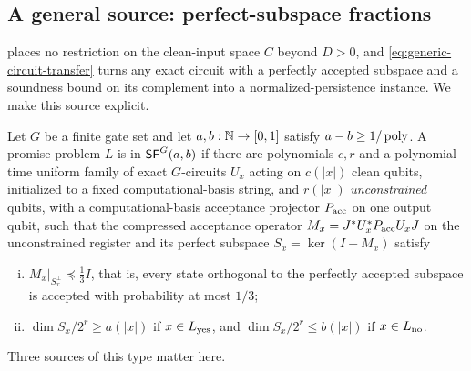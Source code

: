 \subsection{A general source: perfect-subspace fractions}
\label{sec:sf}

 places no restriction on the clean-input space \(C\)
beyond \(D>0\), and \cref{eq:generic-circuit-transfer} turns any exact
circuit with a perfectly accepted subspace and a soundness bound on its
complement into a normalized-persistence instance.  We make this source
explicit.

\begin{definition}
\label{def:sf}
Let \(G\) be a finite gate set and let \(a,b:\mathbb{N}\to[0,1]\) satisfy
\(a-b\ge1/\operatorname{poly}\).  A promise problem \(L\) is in \(\mathsf{SF}^{G}(a,b)\) if there
are polynomials \(c,r\) and a polynomial-time uniform family of exact
\(G\)-circuits \(U_x\) acting on \(c(|x|)\) clean qubits, initialized to a
fixed computational-basis string, and \(r(|x|)\) \emph{unconstrained}
qubits, with a computational-basis acceptance projector \(P_{\rm acc}\) on
one output qubit, such that the compressed acceptance operator
\(M_x=J^*U_x^*P_{\rm acc}U_xJ\) on the unconstrained register and its perfect
subspace \(S_x=\ker(I-M_x)\) satisfy
\begin{enumerate}[(i)]
\item \(M_x|_{S_x^\perp}\preceq\tfrac13 I\), that is, every state orthogonal
to the perfectly accepted subspace is accepted with probability at most
\(1/3\);
\item \(\dim S_x/2^{r}\ge a(|x|)\) if \(x\in L_{\rm yes}\), and
\(\dim S_x/2^{r}\le b(|x|)\) if \(x\in L_{\rm no}\).
\end{enumerate}
\end{definition}

Three sources of this type matter here.

